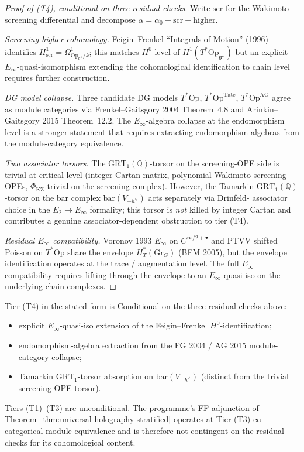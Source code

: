 \documentclass[11pt]{article}
\begin{document}
\begin{proof}[Proof of (T4), conditional on three residual checks]
Write $\mathrm{scr}$ for the Wakimoto screening differential and
decompose $\alpha = \alpha_0 + \mathrm{scr} + \mathrm{higher}$.

\emph{Screening higher cohomology.} Feigin--Frenkel ``Integrals of
Motion'' (1996) identifies
$H^1_{\mathrm{scr}} = \Omega^1_{\mathrm{Op}_{\mathfrak{g}^L}/k}$; this
matches $H^0$-level of $H^1(T^*\mathrm{Op}_{\mathfrak{g}^L})$ but an
explicit $E_{\infty}$-quasi-isomorphism extending the cohomological
identification to chain level requires further construction.

\emph{DG model collapse.} Three candidate DG models
$T^*\mathrm{Op}$, $T^*\mathrm{Op}^{\mathrm{Tate}}$, $T^*\mathrm{Op}^{\mathrm{AG}}$
agree as module categories via Frenkel--Gaitsgory 2004 Theorem~4.8
and Arinkin--Gaitsgory 2015 Theorem~12.2. The $E_{\infty}$-algebra
collapse at the endomorphism level is a stronger statement that
requires extracting endomorphism algebras from the module-category
equivalence.

\emph{Two associator torsors.} The
$\mathrm{GRT}_1(\mathbb{Q})$-torsor on the screening-OPE side is trivial
at critical level (integer Cartan matrix, polynomial Wakimoto
screening OPEs, $\Phi_{\mathrm{KZ}}$ trivial on the screening complex).
However, the Tamarkin $\mathrm{GRT}_1(\mathbb{Q})$-torsor on the bar
complex $\mathrm{bar}(V_{-h^{\vee}})$ acts separately via Drinfeld-
associator choice in the $E_2 \to E_{\infty}$ formality; this torsor
is \emph{not} killed by integer Cartan and contributes a genuine
associator-dependent obstruction to tier (T4).

\emph{Residual $E_{\infty}$ compatibility.} Voronov 1993 $E_{\infty}$
on $C^{\infty/2+\bullet}$ and PTVV shifted Poisson on $T^*\mathrm{Op}$
share the envelope $H^{\ast}_T(\mathrm{Gr}_G)$ (BFM 2005), but the
envelope identification operates at the trace / augmentation level.
The full $E_{\infty}$ compatibility requires lifting through the
envelope to an $E_{\infty}$-quasi-iso on the underlying chain
complexes.
\end{proof}

\begin{remark}[Status of (T4)]
Tier (T4) in the stated form is Conditional on the three residual
checks above:
\begin{itemize}
\item[(R1)] explicit $E_{\infty}$-quasi-iso extension of the
Feigin--Frenkel $H^0$-identification;
\item[(R2)] endomorphism-algebra extraction from the FG 2004 /
AG 2015 module-category collapse;
\item[(R3)] Tamarkin $\mathrm{GRT}_1$-torsor absorption on
$\mathrm{bar}(V_{-h^{\vee}})$ (distinct from the trivial
screening-OPE torsor).
\end{itemize}
Tiers (T1)--(T3) are unconditional. The programme's FF-adjunction
of Theorem~\ref{thm:universal-holography-stratified} operates at
Tier (T3) $\infty$-categorical module equivalence and is therefore
not contingent on the residual checks for its cohomological
content.
\end{remark}
\end{document}
